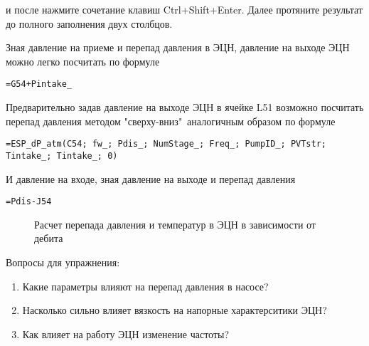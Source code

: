 и после нажмите сочетание клавиш  Ctrl+Shift+Enter. Далее протяните результат до полного заполнения двух столбцов.

Зная давление на приеме и перепад давления в ЭЦН, давление на выходе ЭЦН можно легко посчитать по формуле

{ \small  \texttt{=G54+Pintake\_}}

Предварительно задав давление на выходе ЭЦН в ячейке L51 возможно посчитать перепад давления методом "сверху-вниз"\ аналогичным образом по формуле

{ \small  \texttt{=ESP\_dP\_atm(C54; fw\_; Pdis\_; NumStage\_; Freq\_; PumpID\_; PVTstr; Tintake\_; Tintake\_; 0)}}

И давление на входе, зная давление на выходе и перепад давления

{ \small  \texttt{=Pdis-J54}}

\begin{figure}[h!]
	\center{\texttt{[image: Ex70\_4]}}
	\caption{Расчет перепада давления и температур в ЭЦН в зависимости от дебита}
	\label{ris:Ex70_4}
\end{figure}

Вопросы для упражнения:

\begin{enumerate}
	\item Какие параметры влияют на перепад давления в насосе?
	\item Насколько сильно влияет вязкость на напорные характерситики ЭЦН?
	\item Как влияет на работу ЭЦН изменение частоты?
\end{enumerate}






